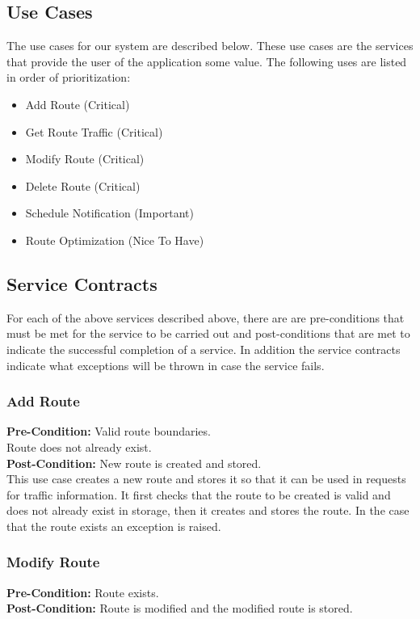 \documentclass[a4paper,12pt]{article}
\begin{document}
\subsection{Use Cases}
The use cases for our system are described below. These use cases are the services that provide the user of the application some value. The following uses are listed in order of prioritization:
\begin{itemize}
\item Add Route 			(Critical)
\item Get Route Traffic		(Critical)
\item Modify Route			(Critical)
\item Delete Route			(Critical)
\item Schedule Notification (Important)
\item Route Optimization 	(Nice To Have)
\end{itemize}
\subsection{Service Contracts}
For each of the above services described above, there are are pre-conditions that must be met for the service to be carried out and post-conditions that are met to indicate the successful completion of a service. In addition the service contracts indicate what exceptions will be thrown in case the service fails.

\subsubsection{Add Route}


\textbf{Pre-Condition: }
Valid route boundaries.\\
Route does not already exist.\\
\textbf{Post-Condition: }
New route is created and stored.\\

This use case creates a new route and stores it so that it can be used in requests for traffic information. It first checks that the route to be created is valid and does not already exist in storage, then it creates and stores the route. In the case that the route exists an exception is raised.
\subsubsection{Modify Route} 
\textbf{Pre-Condition: }
Route exists.\\
\textbf{Post-Condition: }
Route is modified and the modified route is stored.\\
\end{document}
